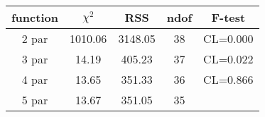 \begin{tabular}{c|c|c|c|c}
function & $\chi^2$ & RSS & ndof & F-test \\
\hline
2 par & 1010.06 & 3148.05 & 38 & CL=0.000 \\
3 par & 14.19 & 405.23 & 37 & CL=0.022 \\
4 par & 13.65 & 351.33 & 36 & CL=0.866 \\
5 par & 13.67 & 351.05 & 35 & \\
\hline
\end{tabular}